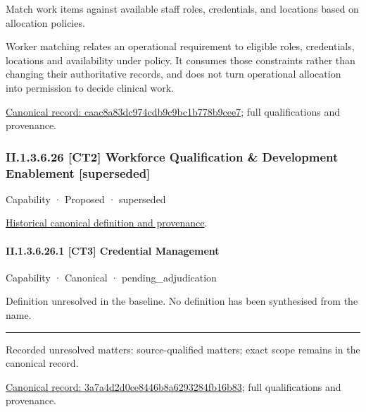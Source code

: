 Match work items against available staff roles, credentials, and locations based on allocation policies.



Worker matching relates an operational requirement to eligible roles, credentials, locations and availability under policy. It consumes those constraints rather than changing their authoritative records, and does not turn operational allocation into permission to decide clinical work.


{\footnotesize \href{../../../../../../../continuum/strategy/capability/feature/caac8a83dc974cdb9c9bc1b778b9cee7.md}{Canonical record: caac8a83dc974cdb9c9bc1b778b9cee7}; full qualifications and provenance.}\par
\subsubsection*{II.1.3.6.26 [CT2] Workforce Qualification \& Development Enablement [superseded]}
\label{navigation:II.1.3.6.26}

\label{element:d24a1f4c4f674c45a95c317998ff4186}
{\small Capability · Proposed · superseded}\par
\href{../../../../../../../continuum/strategy/capability/d24a1f4c4f674c45a95c317998ff4186.md}{Historical canonical definition and provenance}.\par
\paragraph*{II.1.3.6.26.1 [CT3] Credential Management}
\label{navigation:II.1.3.6.26.1}

\label{element:3a7a4d2d0ce8446b8a6293284fb16b83}
{\small Capability · Canonical · pending\_adjudication}\par

Definition unresolved in the baseline. No definition has been synthesised from the name.



\medskip\hrule\medskip

{\small Recorded unresolved matters: source-qualified matters; exact scope remains in the canonical record.}\par
{\footnotesize \href{../../../../../../../continuum/strategy/capability/3a7a4d2d0ce8446b8a6293284fb16b83.md}{Canonical record: 3a7a4d2d0ce8446b8a6293284fb16b83}; full qualifications and provenance.}\par
